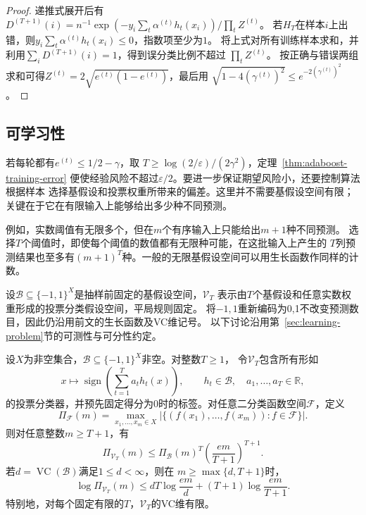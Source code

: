 \begin{proof}
递推式展开后有
$D^{(T+1)}(i)=n^{-1}\exp(-y_i\sum_t\alpha^{(t)} h_t(x_i))/\prod_tZ^{(t)}$。
若$H_T$在样本$i$上出错，则$y_i\sum_t\alpha^{(t)} h_t(x_i)\leq0$，指数项至少为$1$。
将上式对所有训练样本求和，并利用$\sum_iD^{(T+1)}(i)=1$，得到误分类比例不超过
$\prod_tZ^{(t)}$。
按正确与错误两组求和可得$Z^{(t)}=2\sqrt{e^{(t)}(1-e^{(t)})}$，最后用
$\sqrt{1-4(\gamma^{(t)})^2}\leq e^{-2(\gamma^{(t)})^2}$。
\end{proof}

\subsection{可学习性}

若每轮都有$e^{(t)}\leq1/2-\gamma$，取
$T\geq\log(2/\varepsilon)/(2\gamma^2)$，定理~\ref{thm:adaboost-training-error}
便使经验风险不超过$\varepsilon/2$。要进一步保证期望风险小，还要控制算法根据样本
选择基假设和投票权重所带来的偏差。这里并不需要基假设空间有限；
关键在于它在有限输入上能够给出多少种不同预测。

例如，实数阈值有无限多个，但在$m$个有序输入上只能给出$m+1$种不同预测。
选择$T$个阈值时，即使每个阈值的数值都有无限种可能，在这批输入上产生的
$T$列预测结果也至多有$(m+1)^T$种。一般的无限基假设空间可以用生长函数作同样的计数。

设$\mathcal B\subseteq\{-1,1\}^X$是抽样前固定的基假设空间，$\mathcal V_T$
表示由$T$个基假设和任意实数权重形成的投票分类假设空间，平局规则固定。
将$-1,1$重新编码为0,1不改变预测数目，因此仍沿用前文的生长函数及VC维记号。
以下讨论沿用第~\ref{sec:learning-problem}节的可测性与可分性约定。

\begin{theorem}[投票假设空间的生长函数]
\label{thm:vote-growth-infinite}
设$X$为非空集合，$\mathcal B\subseteq\{-1,1\}^X$非空。对整数$T\geq1$，
令$\mathcal V_T$包含所有形如
\[
 x\mapsto\operatorname{sign}\!\left(\sum_{t=1}^T a_t h_t(x)\right),
 \qquad h_t\in\mathcal B,\quad a_1,\ldots,a_T\in\mathbb R,
\]
的投票分类器，并预先固定得分为0时的标签。对任意二分类函数空间$\mathcal F$，定义
\[
 \Pi_{\mathcal F}(m)
 =\max_{x_1,\ldots,x_m\in X}
 \left|\{(f(x_1),\ldots,f(x_m)):f\in\mathcal F\}\right|.
\]
则对任意整数$m\geq T+1$，有
\begin{equation}
 \Pi_{\mathcal V_T}(m)
 \leq\Pi_{\mathcal B}(m)^T
       \left(\frac{em}{T+1}\right)^{T+1}.
 \label{eq:boosting-vote-growth}
\end{equation}
若$d=\operatorname{VC}(\mathcal B)$满足$1\leq d<\infty$，则在
$m\geq\max\{d,T+1\}$时，
\begin{equation}
 \log\Pi_{\mathcal V_T}(m)
 \leq dT\log\frac{em}{d}+(T+1)\log\frac{em}{T+1}.
 \label{eq:infinite-boosting-growth}
\end{equation}
特别地，对每个固定有限的$T$，$\mathcal V_T$的VC维有限。
\end{theorem}

